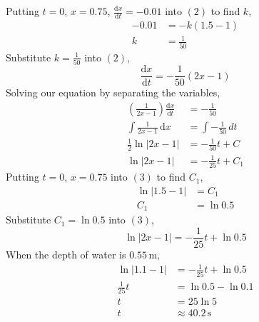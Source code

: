 \documentclass[11pt,a4paper]{book}
\begin{document}
\begin{example}
\begin{enumerate}[label=(\alph*)]
Putting $t=0$, $x=0.75$, ${\displaystyle \frac{\mathrm{d}x}{\mathrm{d}t}=-0.01}$
into $\left(2\right)$ to find $k$,
\begin{align*}
-0.01 & =-k\left(1.5-1\right)\\
k & =\frac{1}{50}
\end{align*}
Substitute ${\displaystyle k=\frac{1}{50}}$ into $\left(2\right)$,
\[
\frac{\mathrm{d}x}{\mathrm{d}t}=-\frac{1}{50}\left(2x-1\right)
\]
Solving our equation by separating the variables,
\begin{align*}
\left(\frac{1}{2x-1}\right)\frac{\mathrm{d}x}{\mathrm{d}t} & =-\frac{1}{50}\\
\int\frac{1}{2x-1}\, \mathrm{d}x & =\int-\frac{1}{50}\,dt\\
\frac{1}{2}\ln\left|2x-1\right| & =-\frac{1}{50}t+C\\
\ln\left|2x-1\right| & =-\frac{1}{25}t+C_{1}\tag{3}
\end{align*}
Putting $t=0$, $x=0.75$ into $\left(3\right)$ to find $C_{1}$,
\begin{align*}
\ln\left|1.5-1\right| & =C_{1}\\
C_{1} & =\ln0.5
\end{align*}
Substitute $C_{1}=\ln0.5$ into $\left(3\right)$,
\[
\ln\left|2x-1\right|=-\frac{1}{25}t+\ln0.5
\]
When the depth of water is $0.55\,\text{m}$,
\begin{align*}
\ln\left|1.1-1\right| & =-\frac{1}{25}t+\ln0.5\\
\frac{1}{25}t & =\ln0.5-\ln0.1\\
t & =25\ln5\\
t & \approx40.2\,\text{s}
\end{align*}

\end{enumerate}

\end{example}

\end{document}

